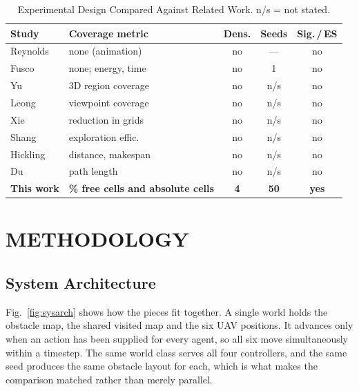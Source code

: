 \documentclass[a4paper, 10pt, conference]{ieeeconf}
\begin{document}
\begin{table}[htb]
\centering
\caption{Experimental Design Compared Against Related Work.
n/s = not stated.}
\label{tab:related}
\scriptsize
\setlength{\tabcolsep}{3pt}
\begin{tabular}{llccc}
\toprule
\textbf{Study} & \textbf{Coverage metric} & \textbf{Dens.} &
\textbf{Seeds} & \textbf{Sig.\,/\,ES} \\
\midrule
Reynolds~\cite{reynolds1987} & none (animation) & no & --- & no \\
Fusco~\cite{fusco2025}       & none; energy, time & no & 1 & no \\
Yu~\cite{yu2025}             & 3D region coverage & no & n/s & no \\
Leong~\cite{leong2024}       & viewpoint coverage & no & n/s & no \\
Xie~\cite{xie2025}           & reduction in grids & no & n/s & no \\
Shang~\cite{shang2025}       & exploration effic. & no & n/s & no \\
Hickling~\cite{hickling2025} & distance, makespan & no & n/s & no \\
Du~\cite{du2023}             & path length & no & n/s & no \\
\midrule
\textbf{This work} & \textbf{\% free cells and absolute cells} &
\textbf{4} & \textbf{50} & \textbf{yes} \\
\bottomrule
\end{tabular}
\end{table}

\section{METHODOLOGY}\label{sec:methodology}

\subsection{System Architecture}\label{sec:arch}

Fig.~\ref{fig:sysarch} shows how the pieces fit together. A single
world holds the obstacle map, the shared visited map and the six UAV
positions. It advances only when an action has been supplied for every
agent, so all six move simultaneously within a timestep. The same
world class serves all four controllers, and the same seed produces
the same obstacle layout for each, which is what makes the comparison
matched rather than merely parallel.
\end{document}
